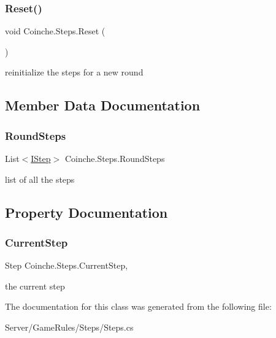 \subsubsection{\texorpdfstring{Reset()}{Reset()}}
{\footnotesize\ttfamily void Coinche.\+Steps.\+Reset (\begin{DoxyParamCaption}{ }\end{DoxyParamCaption})\hspace{0.3cm}{\ttfamily [inline]}}



reinitialize the steps for a new round 



\subsection{Member Data Documentation}
\mbox{\label{class_coinche_1_1_steps_ae755de9f482239900819fc7d90608b55}} 
\subsubsection{\texorpdfstring{Round\+Steps}{RoundSteps}}
{\footnotesize\ttfamily List$<$\hyperlink{interface_coinche_1_1_i_step}{I\+Step}$>$ Coinche.\+Steps.\+Round\+Steps\hspace{0.3cm}{\ttfamily [private]}}



list of all the steps 



\subsection{Property Documentation}
\mbox{\label{class_coinche_1_1_steps_a03916f3a20f2b181afefc14b14663eb3}} 
\subsubsection{\texorpdfstring{Current\+Step}{CurrentStep}}
{\footnotesize\ttfamily Step Coinche.\+Steps.\+Current\+Step\hspace{0.3cm}{\ttfamily [get]}, {\ttfamily [set]}}



the current step 



The documentation for this class was generated from the following file\+:\begin{DoxyCompactItemize}
\item 
Server/\+Game\+Rules/\+Steps/Steps.\+cs\end{DoxyCompactItemize}
